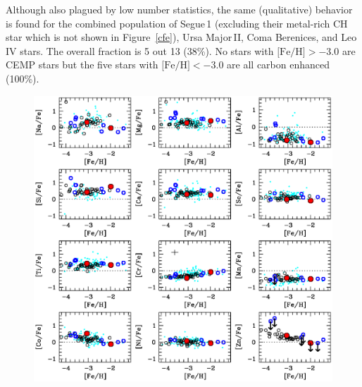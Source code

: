 \documentclass[]{emulateapj}
\begin{document}
Although also plagued by low number statistics, the same (qualitative)
behavior is found for the combined population of Segue\,1 (excluding
their metal-rich CH star which is not shown in Figure~\ref{cfe}), Ursa
Major\,II, Coma Berenices, and Leo\,IV stars. The overall fraction is
5 out 13 (38\%). No stars with $\mbox{[Fe/H]}>-3.0$ are CEMP stars but
the five stars with $\mbox{[Fe/H]}<-3.0$ are all carbon enhanced
(100\%).

\begin{figure}[!th]
 \begin{center}
  \includegraphics[clip=true,width=18cm,bbllx=35, bblly=195, bburx=570,
   bbury=687]{abundance_trends.ps} 
 \end{center}
\end{figure}
\end{document}
